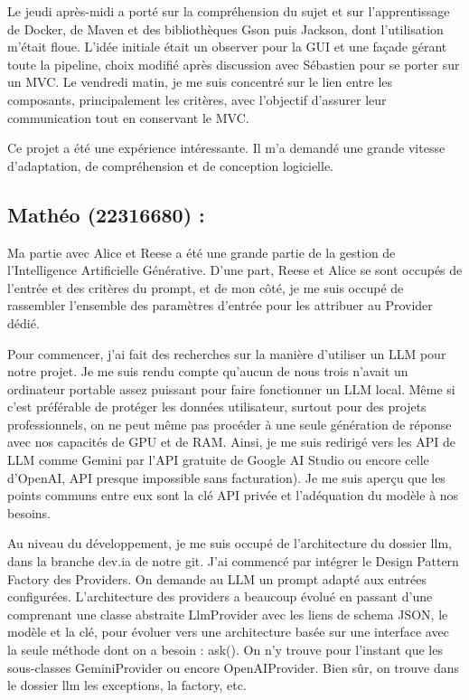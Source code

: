 \documentclass[11pt,a4paper]{article}
\begin{document}
Le jeudi après-midi a porté sur la compréhension du sujet et sur l'apprentissage de Docker, de Maven et des bibliothèques Gson puis Jackson, dont l'utilisation m'était floue. L'idée initiale était un observer pour la GUI et une façade gérant toute la pipeline, choix modifié après discussion avec Sébastien pour se porter sur un MVC. Le vendredi matin, je me suis concentré sur le lien entre les composants, principalement les critères, avec l'objectif d'assurer leur communication tout en conservant le MVC.

Ce projet a été une expérience intéressante. Il m'a demandé une grande vitesse d'adaptation, de compréhension et de conception logicielle.

\subsection*{Mathéo (22316680) :}
Ma partie avec Alice et Reese a été une grande partie de la gestion de l’Intelligence Artificielle Générative. D’une part, Reese et Alice se sont occupés de l’entrée et des critères du prompt, et de mon côté, je me suis occupé de rassembler l’ensemble des paramètres d’entrée pour les attribuer au Provider dédié.

Pour commencer, j’ai fait des recherches sur la manière d’utiliser un LLM pour notre projet. Je me suis rendu compte qu’aucun de nous trois n'avait un ordinateur portable assez puissant pour faire fonctionner un LLM local. Même si c’est préférable de protéger les données utilisateur, surtout pour des projets professionnels, on ne peut même pas procéder à une seule génération de réponse avec nos capacités de GPU et de RAM. Ainsi, je me suis redirigé vers les API de LLM comme Gemini par l’API gratuite de Google AI Studio ou encore celle d’OpenAI, API presque impossible sans facturation). Je me suis aperçu que les points communs entre eux sont la clé API privée et l’adéquation du modèle à nos besoins.

Au niveau du développement, je me suis occupé de l’architecture du dossier llm, dans la branche dev.ia de notre git. J’ai commencé par intégrer le Design Pattern Factory des Providers. On demande au LLM un prompt adapté aux entrées configurées. L’architecture des providers a beaucoup évolué en passant d’une comprenant une classe abstraite LlmProvider avec les liens de schema JSON, le modèle et la clé, pour évoluer vers une architecture basée sur une interface avec la seule méthode dont on a besoin : ask(). On n’y trouve pour l’instant que les sous-classes GeminiProvider ou encore OpenAIProvider. Bien sûr, on trouve dans le dossier llm les exceptions, la factory, etc.
\end{document}
